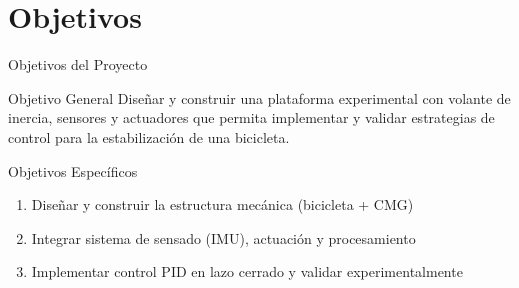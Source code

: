 \documentclass[10pt,xcolor={dvipsnames}]{beamer}
\begin{document}
\section{Objetivos}
\begin{frame}{Objetivos del Proyecto}{}

\begin{block}{Objetivo General}
Diseñar y construir una plataforma experimental con volante de inercia, sensores y actuadores que permita implementar y validar estrategias de control para la estabilización de una bicicleta.
\end{block}

\begin{block}{Objetivos Específicos}
\begin{enumerate}
    \item Diseñar y construir la estructura mecánica (bicicleta + CMG)
    \item Integrar sistema de sensado (IMU), actuación y procesamiento
    \item Implementar control PID en lazo cerrado y validar experimentalmente
\end{enumerate}
\end{block}

\begin{center}
\end{center}
\end{frame}

\end{document}
